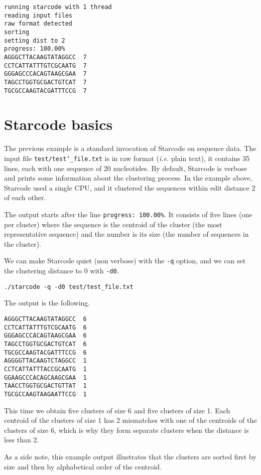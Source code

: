 \documentclass[12pt]{article}
\begin{document}
\begin{verbatim}
running starcode with 1 thread
reading input files
raw format detected
sorting
setting dist to 2
progress: 100.00%
AGGGCTTACAAGTATAGGCC  7
CCTCATTATTTGTCGCAATG  7
GGGAGCCCACAGTAAGCGAA  7
TAGCCTGGTGCGACTGTCAT  7
TGCGCCAAGTACGATTTCCG  7
\end{verbatim}

\section{Starcode basics}

The previous example is a standard invocation of Starcode on sequence
data. The input file \texttt{test/test\char`_file.txt} is in raw format
(\textit{i.e.} plain text), it contains 35 lines, each with one
sequence of 20 nucleotides. By default, Starcode is verbose and prints
some information about the clustering process. In the example above,
Starcode used a single CPU, and it clustered the sequences within
edit distance 2 of each other.

The output starts after the line \texttt{progress: 100.00\%}. It
consists of five lines (one per cluster) where the sequence is the
centroid of the cluster (the most representative sequence) and the
number is its size (the number of sequences in the cluster).

We can make Starcode quiet (non verbose) with the \texttt{-q} option,
and we can set the clustering distance to 0 with \texttt{-d0}.

\begin{verbatim}
./starcode -q -d0 test/test_file.txt
\end{verbatim}

The output is the following.

\begin{verbatim}
AGGGCTTACAAGTATAGGCC  6
CCTCATTATTTGTCGCAATG  6
GGGAGCCCACAGTAAGCGAA  6
TAGCCTGGTGCGACTGTCAT  6
TGCGCCAAGTACGATTTCCG  6
AGGGGTTACAAGTCTAGGCC  1
CCTCATTATTTACCGCAATG  1
GGAAGCCCACAGCAAGCGAA  1
TAACCTGGTGCGACTGTTAT  1
TGCGCCAAGTAAGAATTCCG  1
\end{verbatim}

This time we obtain five clusters of size 6 and five clusters of size 1.
Each centroid of the clusters of size 1 has 2 mismatches with one
of the centroids of the clusters of size 6, which is why they form
separate clusters when the distance is less than 2.

As a side note, this example output illustrates that the clusters
are sorted first by size and then by alphabetical order of the
centroid.
\end{document}
